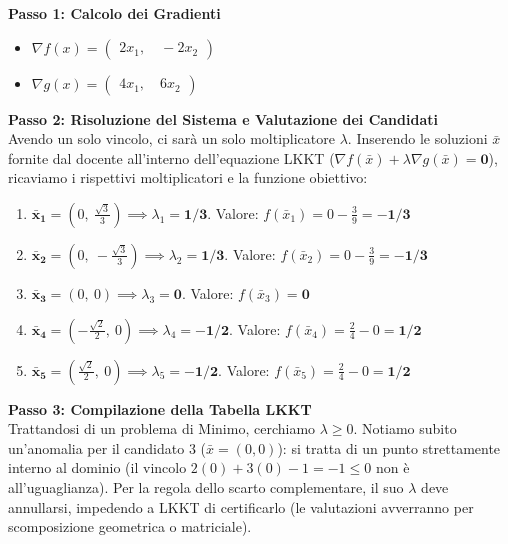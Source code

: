 \documentclass[12pt, a4paper]{article}
\begin{document}
	\textbf{Passo 1: Calcolo dei Gradienti}\\
	\begin{itemize}
		\item $\nabla f(x) = \begin{pmatrix} 2x_1, \quad -2x_2 \end{pmatrix}$
		\item $\nabla g(x) = \begin{pmatrix} 4x_1, \quad 6x_2 \end{pmatrix}$
	\end{itemize}
	
	\textbf{Passo 2: Risoluzione del Sistema e Valutazione dei Candidati}\\
	Avendo un solo vincolo, ci sarà un solo moltiplicatore $\lambda$. Inserendo le soluzioni $\bar{x}$ fornite dal docente all'interno dell'equazione LKKT ($\nabla f(\bar{x}) + \lambda \nabla g(\bar{x}) = \mathbf{0}$), ricaviamo i rispettivi moltiplicatori e la funzione obiettivo:
	
	\begin{enumerate}
		\item $\mathbf{\bar{x}_1} = \left(0, \ \frac{\sqrt{3}}{3}\right) \implies \lambda_1 = \mathbf{1/3}$. Valore: $f(\bar{x}_1) = 0 - \frac{3}{9} = \mathbf{-1/3}$
		\item $\mathbf{\bar{x}_2} = \left(0, \ -\frac{\sqrt{3}}{3}\right) \implies \lambda_2 = \mathbf{1/3}$. Valore: $f(\bar{x}_2) = 0 - \frac{3}{9} = \mathbf{-1/3}$
		\item $\mathbf{\bar{x}_3} = \left(0, \ 0\right) \implies \lambda_3 = \mathbf{0}$. Valore: $f(\bar{x}_3) = \mathbf{0}$
		\item $\mathbf{\bar{x}_4} = \left(-\frac{\sqrt{2}}{2}, \ 0\right) \implies \lambda_4 = \mathbf{-1/2}$. Valore: $f(\bar{x}_4) = \frac{2}{4} - 0 = \mathbf{1/2}$
		\item $\mathbf{\bar{x}_5} = \left(\frac{\sqrt{2}}{2}, \ 0\right) \implies \lambda_5 = \mathbf{-1/2}$. Valore: $f(\bar{x}_5) = \frac{2}{4} - 0 = \mathbf{1/2}$
	\end{enumerate}
	
	\textbf{Passo 3: Compilazione della Tabella LKKT}\\
	Trattandosi di un problema di Minimo, cerchiamo $\lambda \ge 0$. Notiamo subito un'anomalia per il candidato 3 ($\bar{x}=(0,0)$): si tratta di un punto strettamente interno al dominio (il vincolo $2(0) + 3(0) - 1 = -1 \le 0$ non è all'uguaglianza). Per la regola dello scarto complementare, il suo $\lambda$ deve annullarsi, impedendo a LKKT di certificarlo (le valutazioni avverranno per scomposizione geometrica o matriciale).
	
\end{document}

